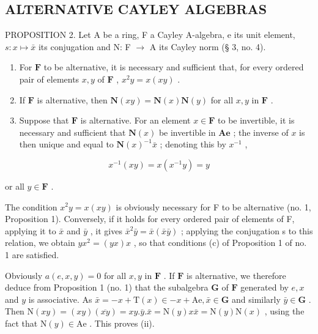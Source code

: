 \subsection{ALTERNATIVE CAYLEY ALGEBRAS}

PROPOSITION 2. Let A be a ring, F a Cayley A-algebra, e its unit element, \(s: x \mapsto \bar{x}\) its conjugation and N: F \(\to\) A its Cayley norm (§ 3, no. 4).

\begin{enumerate}
\def\labelenumi{(\roman{enumi})}
\item
  For \(\mathbf{F}\) to be alternative, it is necessary and sufficient that, for every ordered pair of elements \(x, y\) of \(\mathbf{F}\) , \(x^2y = x(xy)\) .
\item
  If \(\mathbf{F}\) is alternative, then \(\mathbf{N}(xy) = \mathbf{N}(x)\mathbf{N}(y)\) for all \(x,y\) in \(\mathbf{F}\) .
\item
  Suppose that \(\mathbf{F}\) is alternative. For an element \(x \in \mathbf{F}\) to be invertible, it is necessary and sufficient that \(\mathbf{N}(x)\) be invertible in \(\mathbf{Ae}\) ; the inverse of \(x\) is then unique and equal to \(\mathbf{N}(x)^{-1}\bar{x}\) ; denoting this by \(x^{-1}\) ,
\end{enumerate}

\[
x ^ {- 1} (x y) = x \left(x ^ {- 1} y\right) = y
\]

or all \(y \in \mathbf{F}\) .

The condition \(x^{2}y = x(xy)\) is obviously necessary for F to be alternative (no. 1, Proposition 1). Conversely, if it holds for every ordered pair of elements of F, applying it to \(\bar{x}\) and \(\bar{y}\) , it gives \(\bar{x}^{2}\bar{y} = \bar{x}(\bar{x}\bar{y})\) ; applying the conjugation s to this relation, we obtain \(yx^{2} = (yx)x\) , so that conditions (c) of Proposition 1 of no. 1 are satisfied.

Obviously \(a(e, x, y) = 0\) for all \(x, y\) in \(\mathbf{F}\) . If \(\mathbf{F}\) is alternative, we therefore deduce from Proposition 1 (no. 1) that the subalgebra \(\mathbf{G}\) of \(\mathbf{F}\) generated by \(e, x\) and \(y\) is associative. As \(\bar{x} = -x + \mathrm{T}(x) \in -x + \mathrm{Ae}, \bar{x} \in \mathbf{G}\) and similarly \(\bar{y} \in \mathbf{G}\) . Then \(\mathrm{N}(xy) = (xy)(\overline{xy}) = xy.\bar{y}.\bar{x} = \mathrm{N}(y)x\bar{x} = \mathrm{N}(y)\mathrm{N}(x)\) , using the fact that \(\mathrm{N}(y) \in \mathrm{Ae}\) . This proves (ii).


